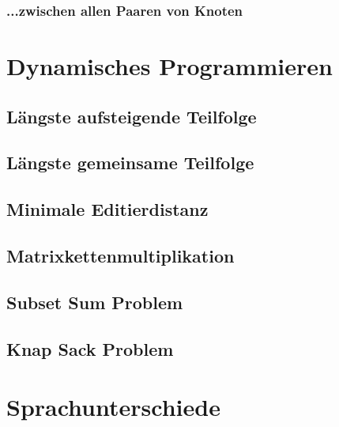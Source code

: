 \documentclass[a4paper]{article}
\begin{document}
\subsubsection{...zwischen allen Paaren von Knoten}
    
    
\section{Dynamisches Programmieren}

\subsection{Längste aufsteigende Teilfolge}

\subsection{Längste gemeinsame Teilfolge}

\subsection{Minimale Editierdistanz}

\subsection{Matrixkettenmultiplikation}

\subsection{Subset Sum Problem}

\subsection{Knap Sack Problem}





\section{Sprachunterschiede}
\end{document}
